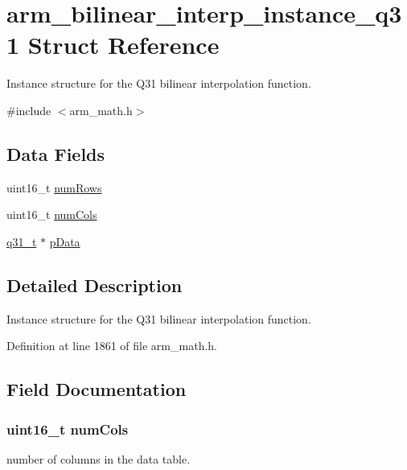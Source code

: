 \hypertarget{structarm__bilinear__interp__instance__q31}{}\section{arm\+\_\+bilinear\+\_\+interp\+\_\+instance\+\_\+q31 Struct Reference}
\label{structarm__bilinear__interp__instance__q31}


Instance structure for the Q31 bilinear interpolation function.  




{\ttfamily \#include $<$arm\+\_\+math.\+h$>$}

\subsection*{Data Fields}
\begin{DoxyCompactItemize}
\item 
uint16\+\_\+t \hyperlink{structarm__bilinear__interp__instance__q31_a1bcf80ccdc2acc29198f1592ae300390}{num\+Rows}
\item 
uint16\+\_\+t \hyperlink{structarm__bilinear__interp__instance__q31_a4bb5ec0d13eb4c9cf887aa8366a44117}{num\+Cols}
\item 
\hyperlink{arm__math_8h_adc89a3547f5324b7b3b95adec3806bc0}{q31\+\_\+t} $\ast$ \hyperlink{structarm__bilinear__interp__instance__q31_ad296f76577326ff280726323536eed6d}{p\+Data}
\end{DoxyCompactItemize}


\subsection{Detailed Description}
Instance structure for the Q31 bilinear interpolation function. 

Definition at line 1861 of file arm\+\_\+math.\+h.



\subsection{Field Documentation}
\subsubsection[{\texorpdfstring{num\+Cols}{numCols}}]{\setlength{\rightskip}{0pt plus 5cm}uint16\+\_\+t num\+Cols}\hypertarget{structarm__bilinear__interp__instance__q31_a4bb5ec0d13eb4c9cf887aa8366a44117}{}\label{structarm__bilinear__interp__instance__q31_a4bb5ec0d13eb4c9cf887aa8366a44117}
number of columns in the data table. 

